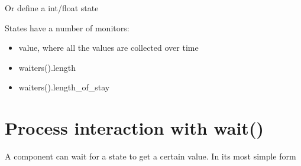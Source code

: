 \documentclass[letterpaper,10pt,english]{sphinxmanual}
\begin{document}
%
\begin{sphinxVerbatim}[commandchars=\\\{\}]
 
\end{sphinxVerbatim}

Or define a int/float state

%
\begin{sphinxVerbatim}[commandchars=\\\{\}]
 
\end{sphinxVerbatim}

States have a number of monitors:
\begin{itemize}
\item {} 
value, where all the values are collected over time

\item {} 
waiters().length

\item {} 
waiters().length\_of\_stay

\end{itemize}


\section{Process interaction with wait()}
\label{\detokenize{State:process-interaction-with-wait}}
A component can wait for a state to get a certain value. In its most simple form

%
\begin{sphinxVerbatim}[commandchars=\\\{\}]
 
\end{sphinxVerbatim}
\end{document}
